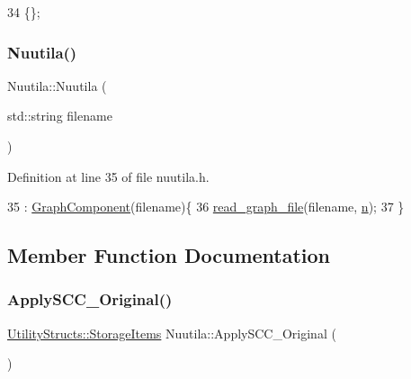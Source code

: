 \begin{DoxyCode}
34 \{\}; 
\end{DoxyCode}
\mbox{\label{class_nuutila_a00bb9066a5a1c9fb03e25481f4f47a0c}} 
\subsubsection{\texorpdfstring{Nuutila()}{Nuutila()}\hspace{0.1cm}{\footnotesize\ttfamily [2/2]}}
{\footnotesize\ttfamily Nuutila\+::\+Nuutila (\begin{DoxyParamCaption}\item[{std\+::string}]{filename }\end{DoxyParamCaption})\hspace{0.3cm}{\ttfamily [inline]}}



Definition at line 35 of file nuutila.\+h.


\begin{DoxyCode}
35                                : \hyperlink{class_graph_component_a35c4a6e5c6f28751b1bd6c451cc07957}{GraphComponent}(filename)\{
36         \hyperlink{class_graph_component_a680363eab8b992d739f055bd484bc000}{read\_graph\_file}(filename, \hyperlink{class_nuutila_a1409929fa0f38709497f8bdb012af71c}{n});
37     \}
\end{DoxyCode}


\subsection{Member Function Documentation}
\mbox{\label{class_nuutila_a7d52f96cf25409704bfd7bf176fcc7c5}} 
\subsubsection{\texorpdfstring{Apply\+S\+C\+C\+\_\+\+Original()}{ApplySCC\_Original()}}
{\footnotesize\ttfamily \hyperlink{struct_utility_structs_1_1_storage_items}{Utility\+Structs\+::\+Storage\+Items} Nuutila\+::\+Apply\+S\+C\+C\+\_\+\+Original (\begin{DoxyParamCaption}{ }\end{DoxyParamCaption})}



